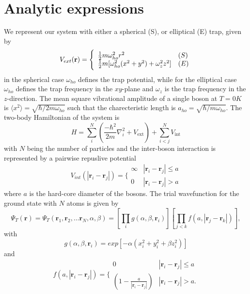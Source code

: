 \documentclass[a4paper, 10pt, english]{revtex4-2} %
\newcommand{\txt}[1]{\text{#1}}
\begin{document}
\section{\large Analytic expressions}
    We represent our system with either a spherical (S), or elliptical (E) trap, given by
    \begin{equation}
            V_{ext}(\mathbf{r}) 
        =   \Bigg\{
        \begin{array}{ll}
            \frac{1}{2}m\omega_{ho}^2r^2 & (S)\\
        \strut
            \frac{1}{2}m[\omega_{ho}^2(x^2+y^2) + \omega_z^2z^2] & (E)
        \label{eq: trap_eqn}
        \end{array}
    \end{equation}
    in the spherical case $\omega_{ho}$ defines the trap potential, while for the elliptical case $\omega_{ho}$ defines the trap frequency in the $xy$-plane and $\omega_z$ is the trap frequency in the $z$-direction.
    The mean square vibrational amplitude of a single boson at $T=0K$ is $\langle x^2\rangle = \sqrt{\hbar/2m\omega_{ho}}$ such that the charecteristic length is $a_{ho} = \sqrt{\hbar/m\omega_{ho}}$.
    The two-body Hamiltonian of the system is
    \begin{equation}
            H
        =   \sum_i^N \left(\frac{-\hbar^2}{2m} \nabla_i^2 + V_\txt{ext}\right) + \sum_{i<j}^N V_\txt{int}
        \label{eq: Hamiltonian}
    \end{equation}
    with $N$ being the number of particles and the inter-boson interaction is represented by a pairwise repuslive potential
    \begin{equation}
        V_{int}(|\mathbf{r}_i-\mathbf{r}_j|) =  \Bigg\{
        \begin{array}{ll}
            \infty & {|\mathbf{r}_i-\mathbf{r}_j|} \leq {a}\\
            0 & {|\mathbf{r}_i-\mathbf{r}_j|} > {a}
        \end{array}
    \end{equation}
    where $a$ is the hard-core diameter of the bosons.
    The trial wavefunction for the ground state with $N$ atoms is given by
    \begin{equation}
        \Psi_T(\mathbf{r})=\Psi_T(\mathbf{r}_1, \mathbf{r}_2, \dots \mathbf{r}_N,\alpha,\beta)
        =\left[
        \prod_i g(\alpha,\beta,\mathbf{r}_i)
        \right]
        \left[
        \prod_{j<k}f(a,|\mathbf{r}_j-\mathbf{r}_k|)
        \right],
        \label{eq: trialwf}
    \end{equation}
    with 
    \begin{equation}
            g(\alpha, \beta, \mathbf{r}_i)
        =   exp\left[-\alpha\left(x_i^2+y_i^2+\beta z_i^2\right)\right]
    \end{equation}
    and
    \begin{equation}
            f(a,|\mathbf{r}_i-\mathbf{r}_j|)=\Bigg\{
        \begin{array}{ll}
            0 & {|\mathbf{r}_i-\mathbf{r}_j|} \leq {a}\\
            (1-\frac{a}{|\mathbf{r}_i-\mathbf{r}_j|}) & {|\mathbf{r}_i-\mathbf{r}_j|} > {a}.
        \end{array}
    \end{equation}
\end{document}
